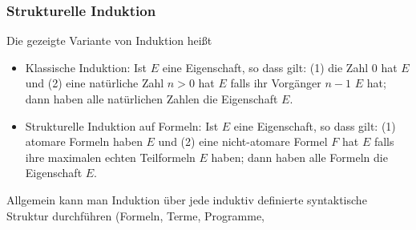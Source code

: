 \documentclass[aspectratio=1610,onlymath]{beamer}
\begin{document}
\begin{frame}\frametitle{Strukturelle Induktion}

Die gezeigte Variante von Induktion heißt 
\begin{itemize}
\item \alert{Klassische Induktion:} Ist $E$ eine Eigenschaft, so dass gilt:
(1) die Zahl $0$ hat $E$ und (2) eine natürliche Zahl $n>0$ hat $E$ falls ihr Vorgänger $n-1$ $E$ hat;
dann haben alle natürlichen Zahlen die Eigenschaft $E$.
\item \alert{Strukturelle Induktion auf Formeln:} Ist $E$ eine Eigenschaft, so dass gilt:
(1) atomare Formeln haben $E$ und (2) eine nicht-atomare Formel $F$ hat $E$ falls ihre maximalen echten Teilformeln $E$ haben;
dann haben alle Formeln die Eigenschaft $E$.
\end{itemize}
Allgemein kann man Induktion über jede induktiv definierte syntaktische Struktur durchführen (Formeln, Terme, Programme, \ghost{\ldots)}\medskip\pause


\end{frame}
\end{document}
